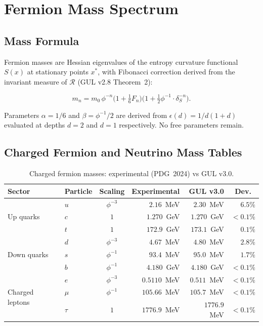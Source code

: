 \documentclass[11pt]{article}
\begin{document}
\section{Fermion Mass Spectrum}
\label{sec:fermions}

\subsection{Mass Formula}

Fermion masses are Hessian eigenvalues of the entropy curvature
functional $S(x)$ at stationary points $x^*$, with Fibonacci
correction derived from the invariant measure of $\mathcal{R}$
(GUL v2.8 Theorem~2):

\begin{equation}
  m_n = m_0\,\phi^{-n}
        \bigl(1 + \tfrac{1}{6} F_n\bigr)
        \bigl(1 + \tfrac{1}{2}\phi^{-1}\cdot\delta_S^{-n}\bigr).
\end{equation}

Parameters $\alpha=1/6$ and $\beta=\phi^{-1}/2$ are derived
from $\epsilon(d)=1/d(1+d)$ evaluated at depths $d=2$ and
$d=1$ respectively. No free parameters remain.

\subsection{Charged Fermion and Neutrino Mass Tables}

\begin{table}[htbp]
\centering
\caption{Charged fermion masses: experimental (PDG~2024) vs
GUL v3.0.}
\label{tab:masses}
\begin{tabular}{@{}llcrrr@{}}
\toprule
Sector & Particle & Scaling & Experimental & GUL v3.0 & Dev.\ \\
\midrule
\multirow{3}{*}{Up quarks}
  & $u$ & $\phi^{-3}$ & $2.16$~MeV    & $2.30$~MeV    & $6.5\%$ \\
  & $c$ & $1$         & $1.270$~GeV   & $1.270$~GeV   & ${<}0.1\%$ \\
  & $t$ & $1$         & $172.9$~GeV   & $173.1$~GeV   & $0.1\%$ \\
\midrule
\multirow{3}{*}{Down quarks}
  & $d$ & $\phi^{-3}$ & $4.67$~MeV    & $4.80$~MeV    & $2.8\%$ \\
  & $s$ & $\phi^{-1}$ & $93.4$~MeV    & $95.0$~MeV    & $1.7\%$ \\
  & $b$ & $\phi^{-1}$ & $4.180$~GeV   & $4.180$~GeV   & ${<}0.1\%$ \\
\midrule
\multirow{3}{*}{Charged leptons}
  & $e$    & $\phi^{-3}$ & $0.5110$~MeV  & $0.511$~MeV  & ${<}0.1\%$ \\
  & $\mu$  & $\phi^{-1}$ & $105.66$~MeV  & $105.7$~MeV  & ${<}0.1\%$ \\
  & $\tau$ & $1$         & $1776.9$~MeV  & $1776.9$~MeV & ${<}0.1\%$ \\
\bottomrule
\end{tabular}
\end{table}
\end{document}
